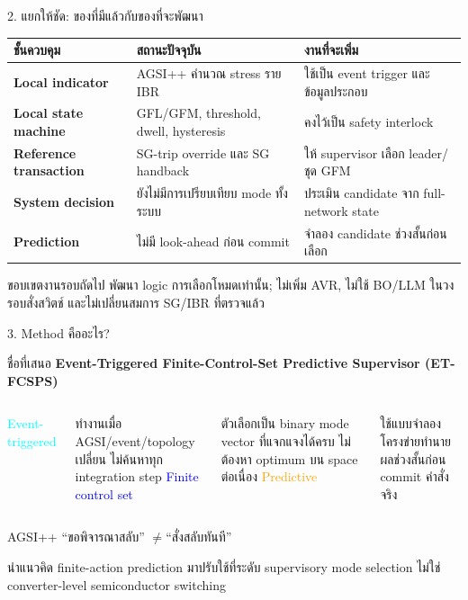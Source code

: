 \documentclass[aspectratio=169,12pt]{beamer}
\begin{document}
\begin{frame}{2. แยกให้ชัด: ของที่มีแล้วกับของที่จะพัฒนา}
\begin{tabularx}{\textwidth}{>{\bfseries}p{}XX}
\toprule
ชั้นควบคุม & สถานะปัจจุบัน & งานที่จะเพิ่ม \\
\midrule
Local indicator & AGSI++ คำนวณ stress ราย IBR & ใช้เป็น event trigger และข้อมูลประกอบ \\
Local state machine & GFL/GFM, threshold, dwell, hysteresis & คงไว้เป็น safety interlock \\
Reference transaction & SG-trip override และ SG handback & ให้ supervisor เลือก leader/ชุด GFM \\
System decision & ยังไม่มีการเปรียบเทียบ mode ทั้งระบบ & ประเมิน candidate จาก full-network state \\
Prediction & ไม่มี look-ahead ก่อน commit & จำลอง candidate ช่วงสั้นก่อนเลือก \\
\bottomrule
\end{tabularx}
\vspace{.35cm}
\begin{block}{ขอบเขตงานรอบถัดไป}
พัฒนา logic การเลือกโหมดเท่านั้น; ไม่เพิ่ม AVR, ไม่ใช้ BO/LLM ในวงรอบสั่งสวิตช์ และไม่เปลี่ยนสมการ SG/IBR ที่ตรวจแล้ว
\end{block}
\end{frame}

\begin{frame}[shrink=4]{3. Method คืออะไร?}
\begin{block}{ชื่อที่เสนอ}
\textbf{Event-Triggered Finite-Control-Set Predictive Supervisor (ET-FCSPS)}
\end{block}
\begin{columns}[T,onlytextwidth]
\centering\textcolor{cyan}{\Large Event-triggered}\par
\small ทำงานเมื่อ AGSI/event/topology เปลี่ยน ไม่ค้นหาทุก integration step
\centering\textcolor{blue}{\Large Finite control set}\par
\small ตัวเลือกเป็น binary mode vector ที่แจกแจงได้ครบ ไม่ต้องหา optimum บน space ต่อเนื่อง
\centering\textcolor{orange}{\Large Predictive}\par
\small ใช้แบบจำลองโครงข่ายทำนายผลช่วงสั้นก่อน commit คำสั่งจริง
\end{columns}
\vspace{.45cm}
\centering
\Large AGSI++ ``ขอพิจารณาสลับ'' \quad$\neq$\quad ``สั่งสลับทันที''
\vspace{.25cm}

\small นำแนวคิด finite-action prediction มาปรับใช้ที่ระดับ supervisory mode selection
ไม่ใช่ converter-level semiconductor switching
\end{frame}
\end{document}
